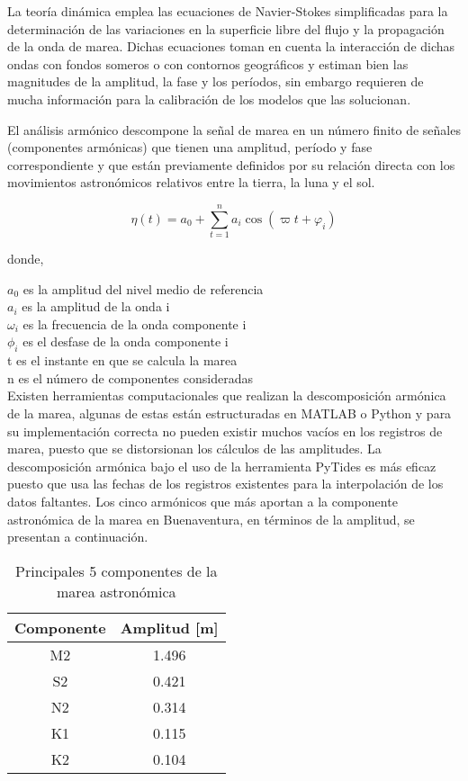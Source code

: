 La teoría dinámica emplea las ecuaciones de Navier-Stokes  simplificadas para la determinación de las variaciones en la superficie libre del flujo y la propagación de la onda de marea. Dichas ecuaciones toman en cuenta la interacción de dichas ondas con fondos someros o con contornos geográficos y estiman bien las magnitudes de la amplitud, la fase y los períodos, sin embargo requieren de mucha información para la calibración de los modelos que las solucionan.

El análisis armónico descompone la señal de marea en un número finito de señales (componentes armónicas) que tienen una amplitud, período y fase correspondiente y que están previamente definidos por su relación directa con los movimientos astronómicos relativos entre la tierra, la luna y el sol.

\begin{equation}
\eta (t)=a_{0}+\sum_{t=1}^{n} a_{i} \cos \left(\varpi t+\varphi_{i}\right)
\end{equation}

donde, 

$a_{0}$ es la amplitud del nivel medio de referencia\\
$a_{i}$ es la amplitud de la onda i\\
$\omega_{i}$ es la frecuencia de la onda componente i\\
$\phi_{i}$ es el desfase de la onda componente i\\
t es el instante en que se calcula la marea\\
n es el número de componentes consideradas\\

Existen herramientas computacionales que realizan la descomposición armónica de la marea, algunas de estas están estructuradas en MATLAB o Python \citep{Pawlowicz2002} y para su implementación correcta no pueden existir muchos vacíos en los registros de marea, puesto que se distorsionan los cálculos de las amplitudes. La descomposición armónica bajo el uso de la herramienta PyTides es más eficaz puesto que usa las fechas de los registros existentes para la interpolación de los datos faltantes. Los cinco armónicos que más aportan a la componente astronómica de la marea en Buenaventura, en términos de la amplitud, se presentan a continuación.

\begin{table}[H]
	\centering
	\begin{tabular}{|c|c|}
		\hline
		Componente & Amplitud [m] \\
		\hline
		M2      &  1.496 \\
		S2      &  0.421 \\
		N2      &  0.314 \\
		K1      &  0.115 \\
		K2      &  0.104 \\
		\hline
	\end{tabular}
	\caption{Principales 5 componentes de la marea astronómica}
	\label{table:componentes}
\end{table}

